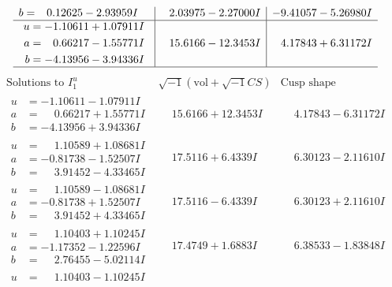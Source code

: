 \documentclass[1p]{elsarticle_modified}
\theoremstyle{definition}
\newcommand{\I}{\sqrt{-1}}
\begin{document}
$$\begin{array}{c|c|c}
\begin{aligned}
b &= \phantom{-}0.12625 - 2.93959 I\end{aligned}
 & \phantom{-}2.03975 - 2.27000 I & -9.41057 - 5.26980 I \\ \hline\begin{aligned}
u &= -1.10611 + 1.07911 I \\
a &= \phantom{-}0.66217 - 1.55771 I \\
b &= -4.13956 - 3.94336 I\end{aligned}
 & \phantom{-}15.6166 - 12.3453 I & \phantom{-}4.17843 + 6.31172 I\\
 \hline 
 \end{array}$$\newpage$$\begin{array}{c|c|c}  
\text{Solutions to }I^u_{1}& \I (\text{vol} + \sqrt{-1}CS) & \text{Cusp shape}\\
 \hline 
\begin{aligned}
u &= -1.10611 - 1.07911 I \\
a &= \phantom{-}0.66217 + 1.55771 I \\
b &= -4.13956 + 3.94336 I\end{aligned}
 & \phantom{-}15.6166 + 12.3453 I & \phantom{-}4.17843 - 6.31172 I \\ \hline\begin{aligned}
u &= \phantom{-}1.10589 + 1.08681 I \\
a &= -0.81738 - 1.52507 I \\
b &= \phantom{-}3.91452 - 4.33465 I\end{aligned}
 & \phantom{-}17.5116 + 6.4339 I & \phantom{-}6.30123 - 2.11610 I \\ \hline\begin{aligned}
u &= \phantom{-}1.10589 - 1.08681 I \\
a &= -0.81738 + 1.52507 I \\
b &= \phantom{-}3.91452 + 4.33465 I\end{aligned}
 & \phantom{-}17.5116 - 6.4339 I & \phantom{-}6.30123 + 2.11610 I \\ \hline\begin{aligned}
u &= \phantom{-}1.10403 + 1.10245 I \\
a &= -1.17352 - 1.22596 I \\
b &= \phantom{-}2.76455 - 5.02114 I\end{aligned}
 & \phantom{-}17.4749 + 1.6883 I & \phantom{-}6.38533 - 1.83848 I \\ \hline\begin{aligned}
u &= \phantom{-}1.10403 - 1.10245 I \\

\end{aligned}
\end{array}$$
\end{document}
